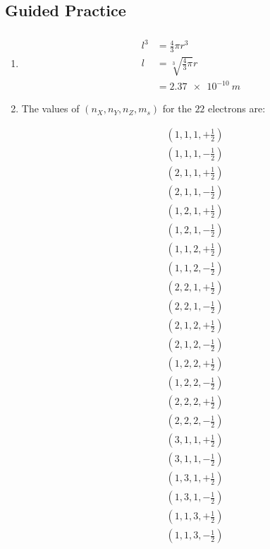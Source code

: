 \documentclass{article}
\begin{document}
\subsection{Guided Practice}

\subsubsection{}

\begin{enumerate}
  \item

        \begin{align*}
          l^3 & = \frac{4}{3} \pi r^3         \\
          l   & = \sqrt[3]{\frac{4}{3} \pi} r \\
              & = \qty{2.37e-10}{m}
        \end{align*}

  \item The values of $(n_X, n_Y, n_Z, m_s)$ for the $22$ electrons are:

        \begin{align*}
           & \left( 1, 1, 1, +\frac{1}{2} \right) \\
           & \left( 1, 1, 1, -\frac{1}{2} \right) \\
           & \left( 2, 1, 1, +\frac{1}{2} \right) \\
           & \left( 2, 1, 1, -\frac{1}{2} \right) \\
           & \left( 1, 2, 1, +\frac{1}{2} \right) \\
           & \left( 1, 2, 1, -\frac{1}{2} \right) \\
           & \left( 1, 1, 2, +\frac{1}{2} \right) \\
           & \left( 1, 1, 2, -\frac{1}{2} \right) \\
           & \left( 2, 2, 1, +\frac{1}{2} \right) \\
           & \left( 2, 2, 1, -\frac{1}{2} \right) \\
           & \left( 2, 1, 2, +\frac{1}{2} \right) \\
           & \left( 2, 1, 2, -\frac{1}{2} \right) \\
           & \left( 1, 2, 2, +\frac{1}{2} \right) \\
           & \left( 1, 2, 2, -\frac{1}{2} \right) \\
           & \left( 2, 2, 2, +\frac{1}{2} \right) \\
           & \left( 2, 2, 2, -\frac{1}{2} \right) \\
           & \left( 3, 1, 1, +\frac{1}{2} \right) \\
           & \left( 3, 1, 1, -\frac{1}{2} \right) \\
           & \left( 1, 3, 1, +\frac{1}{2} \right) \\
           & \left( 1, 3, 1, -\frac{1}{2} \right) \\
           & \left( 1, 1, 3, +\frac{1}{2} \right) \\
           & \left( 1, 1, 3, -\frac{1}{2} \right)
        \end{align*}


\end{enumerate}
\end{document}
